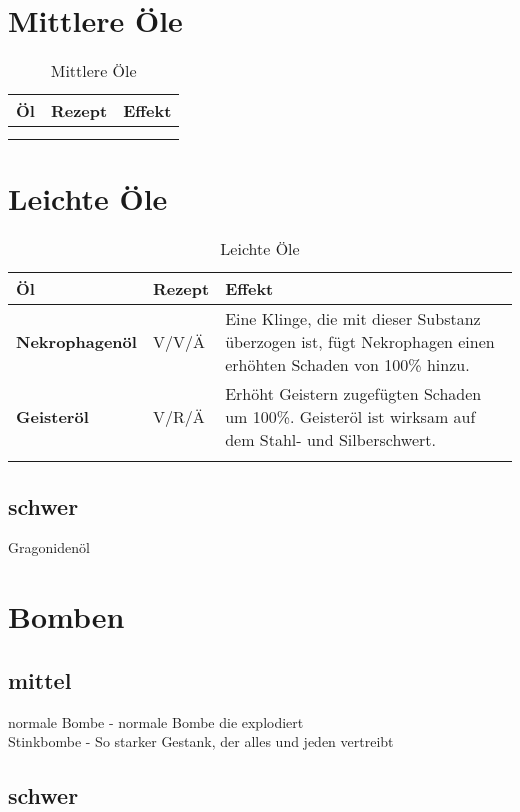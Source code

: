\section{Mittlere Öle}
\begin{longtable}{|p{4cm}|p{}|p{9cm}|}
\hline
\textbf{Öl} & \textbf{Rezept} & \textbf{Effekt} \\ \hline

\textbf{} &  &  \\ \hline

\caption{Mittlere Öle}
\label{tab:mittlere_oele}
\end{longtable}


\section{Leichte Öle}
\begin{longtable}{|p{4cm}|p{}|p{9cm}|}
\hline
\textbf{Öl} & \textbf{Rezept} & \textbf{Effekt} \\ \hline

\textbf{Nekrophagenöl} & V/V/Ä & Eine Klinge, die mit dieser Substanz überzogen ist, fügt Nekrophagen einen erhöhten Schaden von 100\% hinzu. \\ \hline

\textbf{Geisteröl} & V/R/Ä & Erhöht Geistern zugefügten Schaden um 100\%. Geisteröl ist wirksam auf dem Stahl- und Silberschwert.  \\ \hline

\caption{Leichte Öle}
\label{tab:leichte_oele}
\end{longtable}


\subsection{schwer}
Gragonidenöl \\


\section{Bomben}
\subsection{mittel}
normale Bombe - normale Bombe die explodiert \\
Stinkbombe - So starker Gestank, der alles und jeden vertreibt \\

\subsection{schwer}




